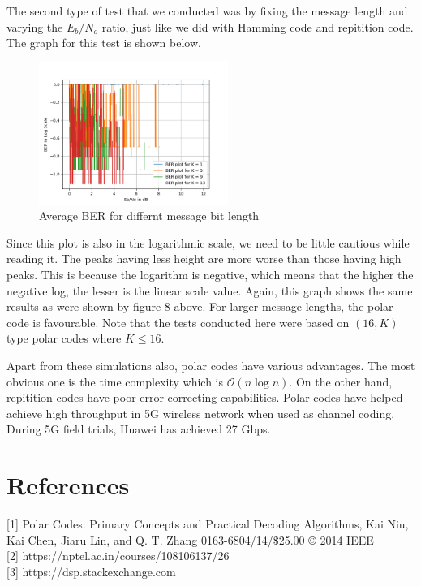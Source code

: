 \documentclass[twocolumn]{report}
\begin{document}
\par The second type of test that we conducted was by fixing the message length and varying the $E_{b}/N_{o}$ ratio, just like we did with Hamming code and repitition code. The graph for this test is shown below.
\begin{figure}[H]
\centering \includegraphics[width=0.55\textwidth, height=0.4\textheight]{polar2.png}
\caption{Average BER for differnt message bit length}
\end{figure}
Since this plot is also in the logarithmic scale, we need to be little cautious while reading it. The peaks having less height are more worse than those having high peaks. This is because the logarithm is negative, which means that the higher the negative log, the lesser is the linear scale value. Again, this graph shows the same results as were shown by figure 8 above. For larger message lengths, the polar code is favourable. Note that the tests conducted here were based on $(16, K)$ type polar codes where $K\leq16$.
\par Apart from these simulations also, polar codes have various advantages. The most obvious one is the time complexity which is $\mathcal{O}(n\log{n})$. On the other hand, repitition codes have poor error correcting capabilities. Polar codes have helped achieve high throughput in 5G wireless network when used as channel coding. During 5G field trials, Huawei has achieved 27 Gbps. 

\section{References}

[1] Polar Codes: Primary Concepts and
Practical Decoding Algorithms, Kai Niu, Kai Chen, Jiaru Lin, and Q. T. Zhang 0163-6804/14/\$25.00 © 2014 IEEE \\

[2] https://nptel.ac.in/courses/108106137/26 \\

[3] https://dsp.stackexchange.com
\end{document}
